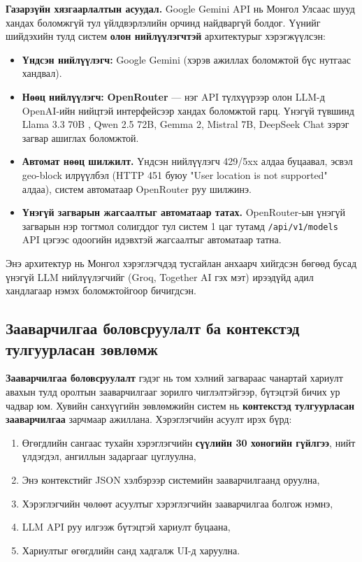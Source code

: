 \textbf{Газарзүйн хязгаарлалтын асуудал.} Google Gemini API нь Монгол Улсаас шууд хандах боломжгүй тул үйлдвэрлэлийн орчинд найдваргүй болдог. Үүнийг шийдэхийн тулд систем \textbf{олон нийлүүлэгчтэй} архитектурыг хэрэгжүүлсэн:
\begin{itemize}
    \item \textbf{Үндсэн нийлүүлэгч:} Google Gemini \cite{gemini} (хэрэв ажиллах боломжтой бүс нутгаас хандвал).
    \item \textbf{Нөөц нийлүүлэгч:} \textbf{OpenRouter} \cite{openrouter} --- нэг API түлхүүрээр олон LLM-д OpenAI-ийн нийцтэй интерфейсээр хандах боломжтой гарц. Үнэгүй түвшинд Llama 3.3 70B \cite{llama3}, Qwen 2.5 72B, Gemma 2, Mistral 7B, DeepSeek Chat зэрэг загвар ашиглах боломжтой.
    \item \textbf{Автомат нөөц шилжилт.} Үндсэн нийлүүлэгч 429/5xx алдаа буцаавал, эсвэл geo-block илрүүлбэл (HTTP 451 буюу "User location is not supported" алдаа), систем автоматаар OpenRouter руу шилжинэ.
    \item \textbf{Үнэгүй загварын жагсаалтыг автоматаар татах.} OpenRouter-ын үнэгүй загварын нэр тогтмол солигддог тул систем 1 цаг тутамд \texttt{/api/v1/models} API цэгээс одоогийн идэвхтэй жагсаалтыг автоматаар татна.
\end{itemize}

Энэ архитектур нь Монгол хэрэглэгчдэд тусгайлан анхаарч хийгдсэн бөгөөд бусад үнэгүй LLM нийлүүлэгчийг (Groq, Together AI гэх мэт) ирээдүйд адил хандлагаар нэмэх боломжтойгоор бичигдсэн.

\subsection{Зааварчилгаа боловсруулалт ба контекстэд тулгуурласан зөвлөмж}
\textbf{Зааварчилгаа боловсруулалт} гэдэг нь том хэлний загвараас чанартай хариулт авахын тулд оролтын зааварчилгааг зорилго чиглэлтэйгээр, бүтэцтэй бичих ур чадвар юм. Хувийн санхүүгийн зөвлөмжийн систем нь \textbf{контекстэд тулгуурласан зааварчилгаа} зарчмаар ажиллана. Хэрэглэгчийн асуулт ирэх бүрд:
\begin{enumerate}
    \item Өгөгдлийн сангаас тухайн хэрэглэгчийн \textbf{сүүлийн 30 хоногийн гүйлгээ}, нийт үлдэгдэл, ангиллын задаргааг цуглуулна,
    \item Энэ контекстийг JSON хэлбэрээр системийн зааварчилгаанд оруулна,
    \item Хэрэглэгчийн чөлөөт асуултыг хэрэглэгчийн зааварчилгаа болгож нэмнэ,
    \item LLM API руу илгээж бүтэцтэй хариулт буцаана,
    \item Хариултыг өгөгдлийн санд хадгалж UI-д харуулна.
\end{enumerate}

